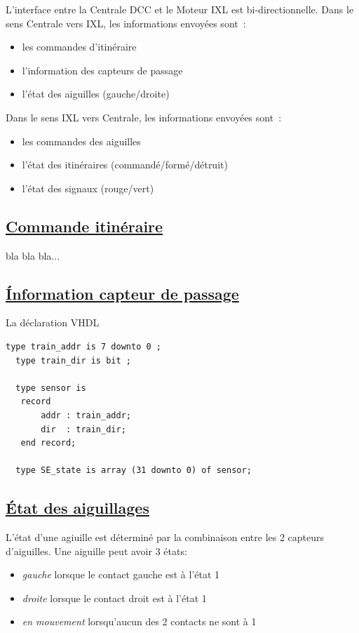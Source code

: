 L'interface entre la Centrale DCC et le Moteur IXL est bi-directionnelle. 
Dans le sens Centrale vers IXL, les informations envoyées sont~:
\begin{itemize}
\item les commandes d'itinéraire
\item l'information des capteurs de passage
\item l'état des aiguilles (gauche/droite)
\end{itemize}

Dans le sens IXL vers Centrale, les informations envoyées sont~:
\begin{itemize}
\item les commandes des aiguilles
\item l'état des itinéraires (commandé/formé/détruit)
\item l'état des signaux (rouge/vert)
\end{itemize}

\subsection{\underline{Commande itinéraire}}
\label{sec:ixl_iti}

bla bla bla...

\subsection{\underline{\'Information capteur de passage}}
\label{sec:ixl_cdv}



\medskip
La déclaration VHDL
\begin{lstlisting}[style=vhdl]
  type train_addr is 7 downto 0 ;
  type train_dir is bit ;

  type sensor is
   record
       addr : train_addr;
       dir  : train_dir;
   end record;

  type SE_state is array (31 downto 0) of sensor;
\end{lstlisting}


\subsection{\underline{\'Etat des aiguillages}}
\label{sec:ixl_aig}

L'état d'une agiuille est déterminé par la combinaison entre les 2
capteurs d'aiguilles.  Une aiguille peut avoir 3 états:
\begin{itemize}
\item \emph{gauche} lorsque le contact gauche est à l'état 1
\item \emph{droite} lorsque le contact droit est à l'état 1
\item \emph{en mouvement} lorsqu'aucun des 2 contacts ne sont à 1
\end{itemize}

